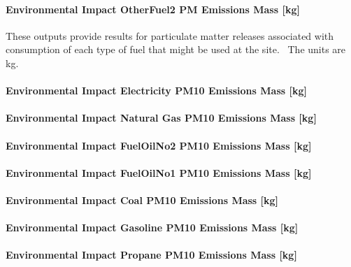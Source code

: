 \paragraph{Environmental Impact OtherFuel2 PM Emissions Mass {[}kg{]}}\label{environmental-impact-otherfuel2-pm-emissions-mass-kg}

These outputs provide results for particulate matter releases associated with consumption of each type of fuel that might be used at the site.~ The units are kg.

\paragraph{Environmental Impact Electricity PM10 Emissions Mass {[}kg{]}}\label{environmental-impact-electricity-pm10-emissions-mass-kg}

\paragraph{Environmental Impact Natural Gas PM10 Emissions Mass {[}kg{]}}\label{environmental-impact-natural-gas-pm10-emissions-mass-kg}

\paragraph{Environmental Impact FuelOilNo2 PM10 Emissions Mass {[}kg{]}}\label{environmental-impact-fuel-oil-2-pm10-emissions-mass-kg}

\paragraph{Environmental Impact FuelOilNo1 PM10 Emissions Mass {[}kg{]}}\label{environmental-impact-fuel-oil-1-pm10-emissions-mass-kg}

\paragraph{Environmental Impact Coal PM10 Emissions Mass {[}kg{]}}\label{environmental-impact-coal-pm10-emissions-mass-kg}

\paragraph{Environmental Impact Gasoline PM10 Emissions Mass {[}kg{]}}\label{environmental-impact-gasoline-pm10-emissions-mass-kg}

\paragraph{Environmental Impact Propane PM10 Emissions Mass {[}kg{]}}\label{environmental-impact-propane-pm10-emissions-mass-kg}

